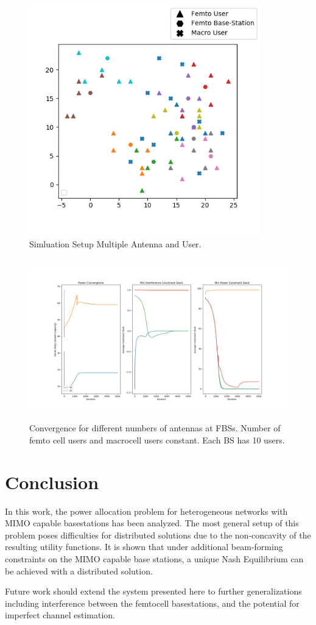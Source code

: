 \documentclass[12pt,a4paper]{report}
\begin{document}
\begin{figure}[H]
	\includegraphics[width=\textwidth,height = 10cm]{figures/system_figure_multiple}
	  \caption{Simluation Setup Multiple Antenna and User.
	  }
\end{figure}


\begin{figure}[H]
	  	\includegraphics[width=\textwidth,height = 7cm]{figures/increasing_antenna}
	  		  \caption{Convergence for different numbers of antennas at FBSs. Number of femto cell users and macrocell users constant. Each BS has 10 users.}
	  \label{fig:}
\end{figure}



\chapter{Conclusion}
In this work, the power allocation problem for heterogeneous networks with MIMO capable basestations has been analyzed. The most general setup of this problem poses difficulties for distributed solutions due to the non-concavity of the resulting utility functions. It is shown that under additional beam-forming constraints on the MIMO capable base stations, a unique Nash Equilibrium can be achieved with a distributed solution. 
\par
Future work should extend the system presented here to further generalizations including interference between the femtocell basestations, and the potential for imperfect channel estimation. 
\newpage

\end{document}

